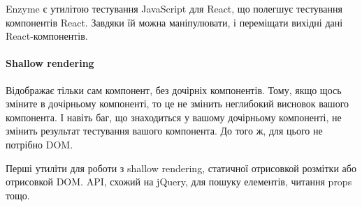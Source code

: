 Enzyme є утилітою тестування JavaScript для React, що полегшує тестування компонентів React. Завдяки їй можна маніпулювати, і переміщати вихідні дані React-компонентів.

\paragraph{Shallow rendering}

Відображає тільки сам компонент, без дочірніх компонентів. Тому, якщо щось зміните в дочірньому компоненті, то це не змінить неглибокий висновок вашого компонента. І навіть баг, що знаходиться у вашому дочірньому компоненті, не змінить результат тестування вашого компонента. До того ж, для цього не потрібно DOM.

Перші утиліти для роботи з shallow rendering, статичної отрисовкой розмітки або отрисовкой DOM.
API, схожий на jQuery, для пошуку елементів, читання props тощо.
